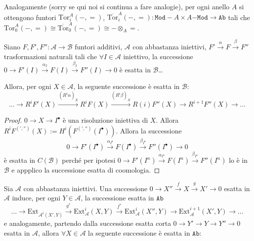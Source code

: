 Analogamente (sorry se qui noi si continua a fare analogie), per ogni anello
\(A\) si ottengono funtori \(\mathrm{Tor}_i^{A}{(-, =)}\),
\(\overline{\mathrm{Tor}}_i^{A}{(-, =)} : \mathtt{Mod-}A \times A\mathtt{-Mod}
\to \mathtt{Ab}\) tali che \(\mathrm{Tor}_0^{A}{(-, =)} \cong
\overline{\mathrm{Tor}}_0^{A}{(-, =)} \cong - \otimes_A =\).

\begin{proposition}{}
    Siano \(F, F', F'' : \mathcal{A} \to \mathcal{B}\) funtori additivi,
    \(\mathcal{A}\) con abbastanza iniettivi, \(F' \overset{\alpha}{\to} F
    \overset{\beta}{\to} F''\) trasformazioni naturali tali che \(\forall I \in
    \mathcal{A}\) iniettivo, la successione \(0 \to F'{(I)}
    \overset{\alpha_I}{\to} F{(I)} \overset{\beta_I}{\to} F''{(I)} \to 0\) è
    esatta in \(\mathcal{B}\)\dots
    
    Allora, per ogni \(X \in \mathcal{A}\), la seguente successione è esatta in
    \(\mathcal{B}\):
    \[
      \dots \to R^{i}F'{(X)} \overset{{(R^{i}\alpha)}_X}{\to} R^{i}F{(X)}
      \overset{{(R^{i}\beta)}_X}{\to} R{(i)}F''{(X)} \to R^{i+1}F''{(X)} \to \dots
    \]
\end{proposition}

\begin{proof}{}
    \(0 \to X \to I^\bullet\) è una risoluzione iniettiva di \(X\). Allora
    \(R^{i}F^{(', '')}{(X)} := H^{i}{(F^{{(', '')}}{(I^\bullet)})}\). Allora la
    successione 
    \[
      0 \to F'{(I^\bullet)} \overset{\alpha_{I^\bullet} }{\to} F{(I^\bullet)}
      \overset{\beta_{I^\bullet} }{\to} F''{(I^\bullet)} \to 0
    \]
    è esatta in \(C{(\mathcal{B})}\) perché per ipotesi \(0 \to F'{(I^{n})}
    \overset{\alpha_{I^{n}} }{\to} F{(I^{n})} \overset{\beta_{I^{n}} }{\to}
    F''{(I^{n})}\) lo è in \(\mathcal{B}\) e appplico la successione esatta di
    coomologia.
\end{proof}

\begin{corollary}{}
    Sia \(\mathcal{A}\) con abbastanza iniettivi. Una successione \(0 \to X''
    \overset{f}{\to} X \overset{g}{\to} X' \to 0\) esatta in \(\mathcal{A}\)
    induce, per ogni \(Y \in \mathcal{A}\), la successione esatta in
    \(\mathtt{Ab}\) 
    \[
      \dots \to \mathrm{Ext}_{\mathcal{A}^{i}{(X', Y)}} \overset{g^{*}}{\to} 
      \mathrm{Ext}_{\mathcal{A}}^{i}{(X, Y)} \overset{f^{*}}{\to}  \mathrm{Ext}_{\mathcal{A}}
      ^{i}{(X'', Y)} \to \mathrm{Ext}_\mathcal{A}^{i+1}{(X', Y)} \to \dots
    \]
    e analogamente, partendo dalla successione esatta corta \(0 \to Y' \to Y \to
    Y'' \to 0\) esatta in \(\mathcal{A}\), allora \(\forall X \in \mathcal{A}\)
    la seguente successione è esatta in \(\mathtt{Ab}\):
\end{corollary}


